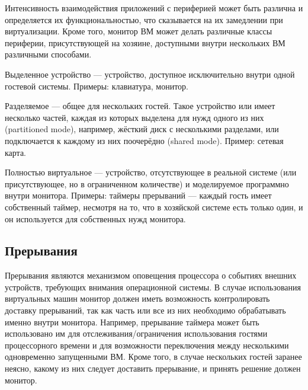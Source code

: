 Интенсивность взаимодействия приложений с периферией может быть различна и определяется их функциональностью, что сказывается на их замедлении при виртуализации. Кроме того, монитор ВМ может делать различные классы периферии, присутствующей на хозяине, доступными внутри нескольких ВМ различными способами.

\begin{description*}
    \item[Выделенное устройство] --- устройство, доступное исключительно внутри одной гостевой системы. Примеры: клавиатура, монитор.
    \item[Разделяемое] --- общее для нескольких гостей. Такое устройство или имеет несколько частей, каждая из которых  выделена для нужд одного из них (\abbr partitioned mode), например, жёсткий диск с несколькими разделами, или подключается к каждому из них поочерёдно (\abbr shared mode). Пример: сетевая карта.
    \item[Полностью виртуальное] --- устройство, отсутствующее в реальной системе (или присутствующее, но в ограниченном количестве) и моделируемое программно внутри монитора. Примеры: таймеры прерываний --- каждый гость имеет собственный таймер, несмотря на то, что в хозяйской системе есть только один, и он используется для собственных нужд монитора.
\end{description*}


\subsection{Прерывания}

Прерывания являются механизмом оповещения процессора о событиях внешних устройств, требующих внимания операционной системы. В случае использования виртуальных машин монитор должен иметь возможность контролировать доставку прерываний, так как часть или все из них необходимо обрабатывать именно внутри монитора. Например, прерывание таймера может быть использовано им для отслеживания/ограничения использования гостями процессорного времени и для возможности переключения между несколькими одновременно запущенными ВМ. Кроме того, в случае нескольких гостей заранее неясно, какому из них следует доставить прерывание, и принять решение должен монитор.

